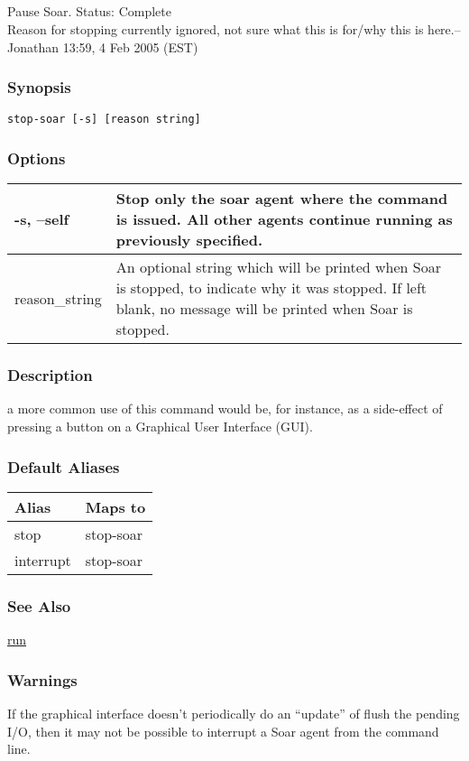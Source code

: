 \subsection{}
\label{stop-soar}
Pause Soar. 
 Status: Complete\\ 
Reason for stopping currently ignored, not sure what this is for/why this is here.--Jonathan 13:59, 4 Feb 2005 (EST) 
\subsubsection*{Synopsis}
\begin{verbatim}
stop-soar [-s] [reason string]
\end{verbatim}
\subsubsection*{Options}
\begin{tabular}{|l|l|}
\hline 
 -s, --self  & Stop only the soar agent where the command is issued. All other agents continue running as previously specified.  \\
 \hline 
 reason\_string  & An optional string which will be printed when Soar is stopped, to indicate why it was stopped. If left blank, no message will be printed when Soar is stopped.  \\
 \hline 
\end{tabular}
\subsubsection*{Description}
a more common use of this command would be, for instance, as a side-effect of pressing a button on a Graphical User Interface (GUI). 
\subsubsection*{Default Aliases}
\begin{tabular}{|l|l|}
\hline 
 Alias  & Maps to  \\
 \hline 
 stop  & stop-soar  \\
 \hline 
 interrupt  & stop-soar  \\
 \hline 
\end{tabular}
\subsubsection*{See Also}
\hyperref[run]{run} \subsubsection*{Warnings}
 If the graphical interface doesn't periodically do an ``update'' of flush the pending I/O, then it may not be possible to interrupt a Soar agent from the command line. 
